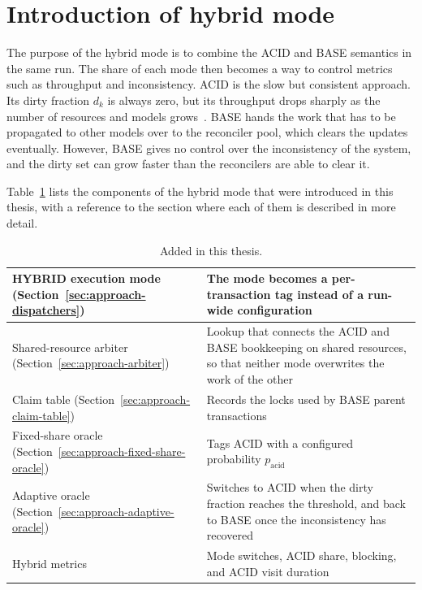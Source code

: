 \section{Introduction of hybrid mode}\label{sec:approach-why-hybrid}

The purpose of the hybrid mode is to combine the ACID and BASE semantics in
the same run. The share of each mode then becomes a way to control metrics
such as throughput and inconsistency. ACID is the slow but consistent
approach. Its dirty fraction $d_k$ is always zero, but its throughput drops
sharply as the number of resources and models grows~\cite{zacouris2026mxs}.
BASE hands the work that has to be propagated to other models over to the
reconciler pool, which clears the updates eventually. However, BASE gives no
control over the inconsistency of the system, and the dirty set can grow
faster than the reconcilers are able to clear it.

Table~\ref{tab:approach-added} lists the components of the hybrid mode that
were introduced in this thesis, with a reference to the section where each of
them is described in more detail.

\begin{table}[htbp]
  \centering
  \captionsetup{format=plain,justification=centering}
  \caption{Added in this thesis.}
  \label{tab:approach-added}
  \footnotesize
  \begin{tabular*}{\textwidth}{@{\extracolsep{\fill}}>{\raggedright\arraybackslash}p{} >{\raggedright\arraybackslash}p{}@{}}
    \toprule
    HYBRID execution mode (Section~\ref{sec:approach-dispatchers}) & The mode
    becomes a per-transaction tag instead of a run-wide configuration \\
    \midrule
    Shared-resource arbiter (Section~\ref{sec:approach-arbiter}) & Lookup
    that connects the ACID and BASE bookkeeping on shared resources, so that
    neither mode overwrites the work of the other \\
    \midrule
    Claim table (Section~\ref{sec:approach-claim-table}) & Records the
    locks used by BASE parent transactions \\
    \midrule
    Fixed-share oracle
    (Section~\ref{sec:approach-fixed-share-oracle}) & Tags ACID with a
    configured probability $p_{\mathrm{acid}}$ \\
    \midrule
    Adaptive oracle (Section~\ref{sec:approach-adaptive-oracle}) & Switches
    to ACID when the dirty fraction reaches the threshold, and back to BASE
    once the inconsistency has recovered \\
    \midrule
    Hybrid metrics & Mode switches, ACID share, blocking, and ACID visit
    duration \\
    \bottomrule
  \end{tabular*}
\end{table}


